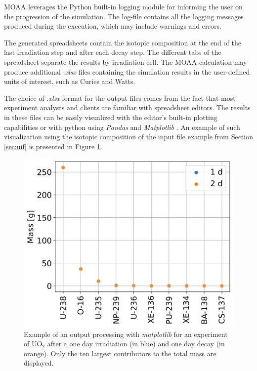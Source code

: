 MOAA leverages the Python built-in logging module for informing the user on the progression of the simulation.
The log-file contains all the logging messages produced during the execution, which may include warnings and errors.

The generated spreadsheets contain the isotopic composition at the end of the last irradiation step and after each decay step.
The different tabs of the spreadsheet separate the results by irradiation cell.
The MOAA calculation may produce additional \textit{.xlsx} files containing the simulation results in the user-defined units of interest, such as Curies and Watts.

The choice of \textit{.xlsx} format for the output files comes from the fact that most experiment analysts and clients are familiar with spreadsheet editors.
The results in these files can be easily visualized with the editor's built-in plotting capabilities or with python using \textit{Pandas} and \textit{Matplotlib} \cite{matplotlib}.
An example of such visualization using the isotopic composition of the input file example from Section \ref{sec:uif} is presented in Figure \ref{fig:output-ex}.

\begin{figure}[htbp!]
  \begin{center}
    \includegraphics[scale=0.60]{figures/test1_grams}
  \end{center}
  \caption{Example of an output processing with \textit{matplotlib} for an experiment of UO$_2$ after a one day irradiation (in blue) and one day decay (in orange). Only the ten largest contributors to the total mass are displayed.}
  \label{fig:output-ex}
\end{figure}

